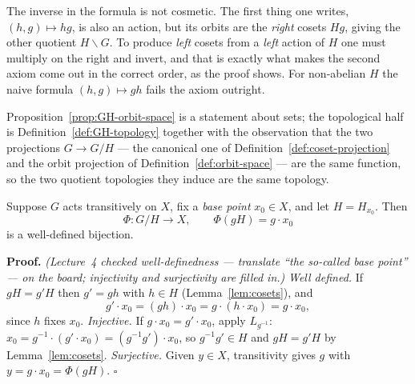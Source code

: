 \documentclass[11pt]{report}
\makeatletter
\newcounter{thmcounter}[section]
\renewenvironment{proof}[1][Proof]{\noindent\textbf{#1.} }{\hfill$\square$\par\vspace{5pt}}
\newcommand{\thmlabel}[1]{\edef\@currentlabel{\arabic{section}.\arabic{thmcounter}}\label{#1}}
\newcommand{\leeref}[1]{\par\smallskip{\raggedleft\footnotesize\textsc{Lee}:\ #1\par}}
\makeatother
\begin{document}
\begin{rembox}\label{rem:homogeneous-3}
The inverse in the formula is not cosmetic. The first thing one writes, $(h,g) \mapsto hg$, is also an action, but its orbits are the \emph{right} cosets $Hg$, giving the other quotient $H \backslash G$. To produce \emph{left} cosets from a \emph{left} action of $H$ one must multiply on the right and invert, and that is exactly what makes the second axiom come out in the correct order, as the proof shows. For non-abelian $H$ the naive formula $(h,g) \mapsto gh$ fails the axiom outright.

Proposition~\ref{prop:GH-orbit-space} is a statement about sets; the topological half is Definition~\ref{def:GH-topology} together with the observation that the two projections $G \to G/H$ --- the canonical one of Definition~\ref{def:coset-projection} and the orbit projection of Definition~\ref{def:orbit-space} --- are the same function, so the two quotient topologies they induce are the same topology.
\end{rembox}

\begin{lembox}\thmlabel{lem:GH-bijection}
Suppose $G$ acts transitively on $X$, fix a \emph{base point} $x_0 \in X$, and let $H = H_{x_0}$. Then
\[
\Phi : G/H \longrightarrow X, \qquad \Phi(gH) = g \cdot x_0
\]
is a well-defined bijection.
\leeref{proof of Theorem 21.18}
\end{lembox}

\begin{proof}
\textit{(Lecture~4 checked well-definedness --- translate ``the so-called base point'' --- on the board; injectivity and surjectivity are filled in.)} \emph{Well defined.} If $gH = g'H$ then $g' = gh$ with $h \in H$ (Lemma~\ref{lem:cosets}), and
\[
g' \cdot x_0 = (gh) \cdot x_0 = g \cdot (h \cdot x_0) = g \cdot x_0,
\]
since $h$ fixes $x_0$. \emph{Injective.} If $g \cdot x_0 = g' \cdot x_0$, apply $L_{g^{-1}}$: $x_0 = g^{-1} \cdot (g' \cdot x_0) = (g^{-1}g') \cdot x_0$, so $g^{-1}g' \in H$ and $gH = g'H$ by Lemma~\ref{lem:cosets}. \emph{Surjective.} Given $y \in X$, transitivity gives $g$ with $y = g \cdot x_0 = \Phi(gH)$.
\end{proof}
\end{document}
